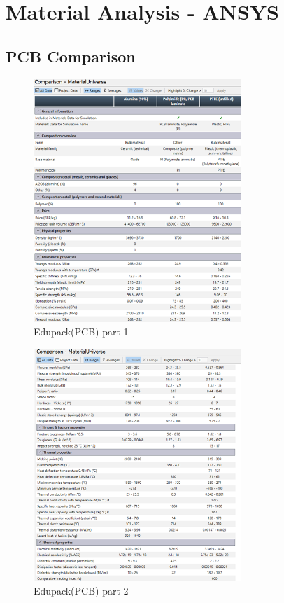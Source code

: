 \section{Material Analysis - ANSYS}

\subsection{PCB Comparison}

\begin{figure}[htbp]
    \centering
    \includegraphics[width=0.7\textwidth]{figures/Appendix-Mats/Fig1PCB.png}
    \caption*{Edupack(PCB) part 1} 
    \label{fig:PCB0}
    \end{figure}

    \begin{figure}[htbp]
        \centering
        \includegraphics[width=0.7\textwidth]{figures/Appendix-Mats/Fig2PCB.png}
        \caption*{Edupack(PCB) part 2} 
        \label{fig:PCB1}
        \end{figure}

